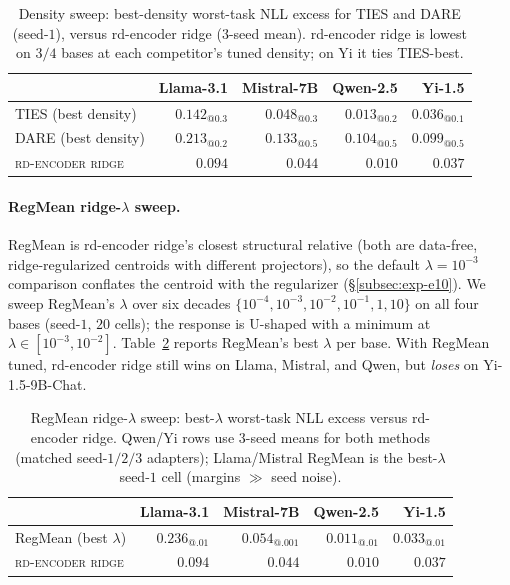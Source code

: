 \begin{table}[t]
\centering
\caption{Density sweep: best-density worst-task NLL excess for TIES and DARE
(seed-$1$), versus rd-encoder ridge ($3$-seed mean). rd-encoder ridge is lowest
on $3/4$ bases at each competitor's tuned density; on Yi it ties TIES-best.}
\label{tab:density-sweep}
\small
\begin{tabular}{lrrrr}
\hline
 & Llama-3.1 & Mistral-7B & Qwen-2.5 & Yi-1.5 \\
\hline
TIES (best density)       & $0.142_{@0.3}$ & $0.048_{@0.3}$ & $0.013_{@0.2}$ & $0.036_{@0.1}$ \\
DARE (best density)       & $0.213_{@0.2}$ & $0.133_{@0.5}$ & $0.104_{@0.5}$ & $0.099_{@0.5}$ \\
\textsc{rd-encoder ridge} & $\mathbf{0.094}$ & $\mathbf{0.044}$ & $\mathbf{0.010}$ & $0.037$ \\
\hline
\end{tabular}
\end{table}

\paragraph{RegMean ridge-$\lambda$ sweep.}
RegMean is rd-encoder ridge's closest structural relative (both are data-free,
ridge-regularized centroids with different projectors), so the default
$\lambda = 10^{-3}$ comparison conflates the centroid with the regularizer
(\S\ref{subsec:exp-e10}). We sweep RegMean's $\lambda$ over six decades
$\{10^{-4}, 10^{-3}, 10^{-2}, 10^{-1}, 1, 10\}$ on all four bases (seed-$1$,
$20$ cells); the response is U-shaped with a minimum at $\lambda \in
[10^{-3}, 10^{-2}]$. Table~\ref{tab:regmean-lambda} reports RegMean's best
$\lambda$ per base. With RegMean tuned, rd-encoder ridge still wins on Llama,
Mistral, and Qwen, but \emph{loses} on Yi-1.5-9B-Chat.

\begin{table}[t]
\centering
\caption{RegMean ridge-$\lambda$ sweep: best-$\lambda$ worst-task NLL excess
versus rd-encoder ridge. Qwen/Yi rows use $3$-seed means for both methods
(matched seed-$1/2/3$ adapters); Llama/Mistral RegMean is the best-$\lambda$
seed-$1$ cell (margins $\gg$ seed noise).}
\label{tab:regmean-lambda}
\small
\begin{tabular}{lrrrr}
\hline
 & Llama-3.1 & Mistral-7B & Qwen-2.5 & Yi-1.5 \\
\hline
RegMean (best $\lambda$)  & $0.236_{@.01}$ & $0.054_{@.001}$ & $0.011_{@.01}$ & $\mathbf{0.033}_{@.01}$ \\
\textsc{rd-encoder ridge} & $\mathbf{0.094}$ & $\mathbf{0.044}$ & $\mathbf{0.010}$ & $0.037$ \\
\hline
\end{tabular}
\end{table}

